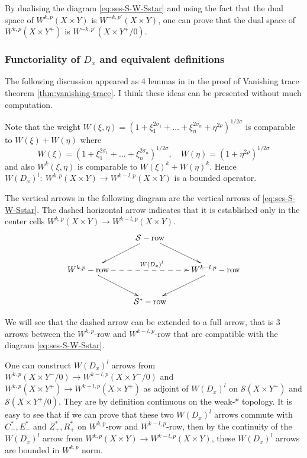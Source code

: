\begin{remark}
By dualising the diagram \eqref{eq:ses-S-W-Sstar} and using the fact that the dual space of
\(W^{k,p}(X\times Y)\) is \(W^{-k, p'}(X\times Y)\), one can prove that the dual space
of \(W^{k,p}(X\times Y^+)\) is \(W^{-k, p'}(X\times Y^+/0)\). 
\end{remark}

\subsubsection{Functoriality of \(D_x\) and equivalent definitions}
\label{sec:org163f9fc}
The following discussion appeared as 4 lemmas in \cite[page
38-42]{hamilton_harmonic_1975} in the proof of Vanishing trace theorem \ref{thm:vanishing-trace}. I
think these ideas can be presented without much computation.

Note that the weight \(W(\xi,\eta) = \left(1 +\xi_1^{2\sigma_1} +\dots +
\xi_n^{2\sigma_n} +\eta^{2\rho} \right)^{1/2\sigma}\) is comparable to \(W(\xi) +
W(\eta)\) where
\[
 W(\xi) = \left(1 +\xi_1^{2\sigma_1} +\dots +
\xi_n^{2\sigma_n} \right)^{1/2\sigma},\quad W(\eta) = \left(1 +\eta^{2\rho} \right)^{1/2\sigma}
\]
and also \(W^k(\xi,\eta)\) is comparable to \(W(\xi)^k + W(\eta)^k\). Hence \(W(D_x)^l:\ W^{k,p}(X\times Y) \longrightarrow W^{k-l,p}(X\times Y)\) is a bounded
operator.

The vertical arrows in the following diagram are the vertical arrows of
\eqref{eq:ses-S-W-Sstar}. The dashed horizontal arrow indicates that it is established only
in the center cells \(W^{k,p}(X\times Y) \longrightarrow W^{k-l,p}(X\times Y)\).
\begin{equation}
\label{eq:S-W-S-3d}
\xymatrix{
 & \mathcal{S}-{\rm row} \ar@{->}[ld] \ar@{->}[rd] &  \\
W^{k,p}-{\rm row} \ar@{->}[rd] \ar@{-->}[rr]^{W(D_x)^l} &  & W^{k-l,p}-{\rm row} \ar@{->}[ld] \\
 & \mathcal{S}^*-{\rm row} & 
}
\end{equation}

We will see that the dashed arrow can be extended to a full arrow, that is 3 arrows
between the \(W^{k,p}\)-row and \(W^{k-l,p}\)-row that are compatible with the diagram
\eqref{eq:ses-S-W-Sstar}.

One can construct \(W(D_x)^l\) arrows from \(W^{k,p}(X\times Y^-/0)
\longrightarrow W^{k-l,p}(X\times Y^-/0)\) and \(W^{k,p}(X\times Y^+)
\longrightarrow W^{k-l,p}(X\times Y^+)\) as adjoint of \(W(D_x)^l\) on
\(\mathcal{S}(X\times Y^+)\) and \(\mathcal{S}(X\times Y^+/0)\). They are by definition continuous on the
weak-* topology. It is easy to see that if we can prove that these two \(W(D_x)^l\) arrows commute with \(C^*_-, E^*_-\) and \(Z^*_+, R^*_+\) on \(W^{k,p}\)-row and \(W^{k-l,p}\)-row, then
by the continuity of the \(W(D_x)^l\) arrow from \(W^{k,p}(X\times Y) \longrightarrow
W^{k-l,p}(X\times Y)\), these \(W(D_x)^l\) arrows are bounded in \(W^{k,p}\) norm.

